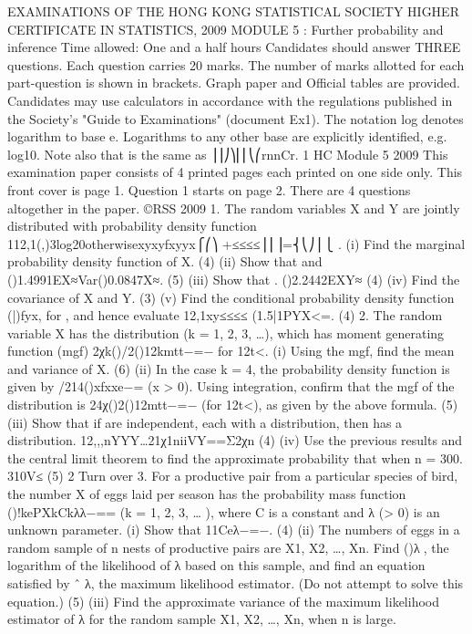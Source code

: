 EXAMINATIONS OF THE HONG KONG STATISTICAL SOCIETY
HIGHER CERTIFICATE IN STATISTICS, 2009
MODULE 5 : Further probability and inference
Time allowed: One and a half hours
Candidates should answer THREE questions.
Each question carries 20 marks.
The number of marks allotted for each part-question is shown in brackets.
Graph paper and Official tables are provided.
Candidates may use calculators in accordance with the regulations published in
the Society's "Guide to Examinations" (document Ex1).
The notation log denotes logarithm to base e.
Logarithms to any other base are explicitly identified, e.g. log10.
Note also that is the same as ⎟⎟⎠⎞⎜⎜⎝⎛rnnCr.
1 HC Module 5 2009
This examination paper consists of 4 printed pages each printed on one side only.
This front cover is page 1.
Question 1 starts on page 2.
There are 4 questions altogether in the paper.
©RSS 2009
1. The random variables X and Y are jointly distributed with probability density function
112,1(,)3log20otherwisexyxyfxyyx⎧⎛⎞ +≤≤≤≤⎪⎜⎟=⎨⎝⎠⎪⎩ .
(i) Find the marginal probability density function of X.
(4)
(ii) Show that and ()1.4991EX≈Var()0.0847X≈.
(5)
(iii) Show that . ()2.2442EXY≈
(4)
(iv) Find the covariance of X and Y.
(3)
(v) Find the conditional probability density function (|)fyx, for , and hence evaluate 12,1xy≤≤≤≤ (1.5|1PYX<=.
(4)
2. The random variable X has the distribution (k = 1, 2, 3, …), which has moment generating function (mgf) 2χk()/2()12kmtt−=− for 12t<.
(i) Using the mgf, find the mean and variance of X.
(6)
(ii) In the case k = 4, the probability density function is given by
/214()xfxxe−= (x > 0).
Using integration, confirm that the mgf of the distribution is 24χ()2()12mtt−=− (for 12t<), as given by the above formula.
(5)
(iii) Show that if are independent, each with a distribution, then has a distribution. 12,,,nYYY…21χ1niiVY==Σ2χn
(4)
(iv) Use the previous results and the central limit theorem to find the approximate probability that when n = 300. 310V≤
(5)
2
Turn over
3. For a productive pair from a particular species of bird, the number X of eggs laid per season has the probability mass function
()!kePXkCkλλ−== (k = 1, 2, 3, … ),
where C is a constant and λ (> 0) is an unknown parameter.
(i) Show that 11Ceλ−=−.
(4)
(ii) The numbers of eggs in a random sample of n nests of productive pairs are X1, X2, …, Xn. Find ()λ􀁁, the logarithm of the likelihood of λ based on this sample, and find an equation satisfied by ˆ
λ, the maximum likelihood estimator. (Do not attempt to solve this equation.)
(5)
(iii) Find the approximate variance of the maximum likelihood estimator of λ for the random sample X1, X2, …, Xn, when n is large.
